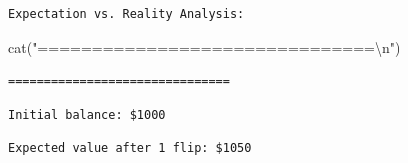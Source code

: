 \documentclass[
  letterpaper,
  DIV=11,
  numbers=noendperiod]{scrartcl}
\newenvironment{Shaded}{\begin{snugshade}}{\end{snugshade}}
\newcommand{\AttributeTok}[1]{\textcolor[rgb]{0.40,0.45,0.13}{#1}}
\newcommand{\FunctionTok}[1]{\textcolor[rgb]{0.28,0.35,0.67}{#1}}
\newcommand{\NormalTok}[1]{\textcolor[rgb]{0.00,0.23,0.31}{#1}}
\newcommand{\SpecialCharTok}[1]{\textcolor[rgb]{0.37,0.37,0.37}{#1}}
\newcommand{\StringTok}[1]{\textcolor[rgb]{0.13,0.47,0.30}{#1}}
\begin{document}
\begin{verbatim}
Expectation vs. Reality Analysis:
\end{verbatim}

\begin{Shaded}
\begin{Highlighting}[]
\FunctionTok{cat}\NormalTok{(}\StringTok{"===============================}\SpecialCharTok{\textbackslash{}n}\StringTok{"}\NormalTok{)}
\end{Highlighting}
\end{Shaded}

\begin{verbatim}
===============================
\end{verbatim}

\begin{Shaded}
\end{Shaded}

\begin{verbatim}
Initial balance: $1000
\end{verbatim}

\begin{Shaded}
\end{Shaded}

\begin{verbatim}
Expected value after 1 flip: $1050
\end{verbatim}

\begin{Shaded}
\end{Shaded}
\end{document}
